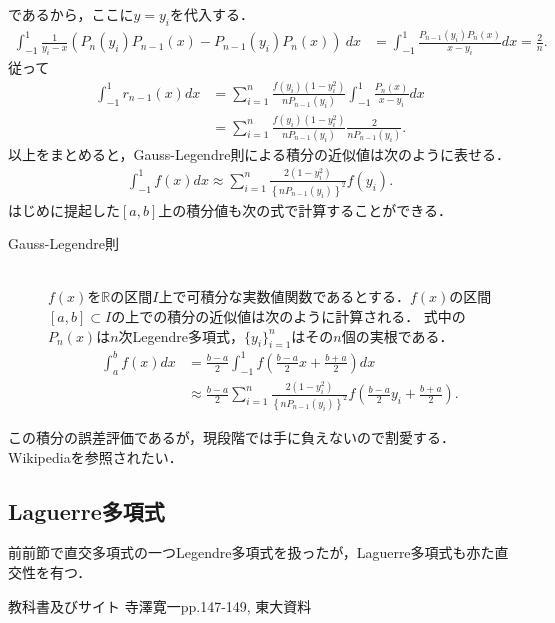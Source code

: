 \documentclass[a4j,papersize,disablejfam,slide,14pt]{jsarticle}
\begin{document}
    であるから，ここに$y = y_i$を代入する．
    \begin{align}
    	\int_{-1}^{1} \frac{1}{y_i - x} \left( P_n(y_i) P_{n-1}(x) - P_{n-1} (y_i) P_n(x) \right)\ dx
        &= \int_{-1}^{1} \frac{P_{n-1} (y_i) P_n(x)}{x - y_i} dx = \frac{2}{n}.
    \end{align}
    従って
    \begin{align}
    	\int_{-1}^{1} r_{n-1}(x) dx &= \sum_{i=1}^{n} \frac{f(y_i) (1-y_i^2)}{nP_{n-1}(y_i)} \int_{-1}^{1} \frac{P_n(x)}{x-y_i} dx \\
        &= \sum_{i=1}^{n} \frac{f(y_i) (1-y_i^2)}{nP_{n-1}(y_i)} \frac{2}{n P_{n-1} (y_i)}.
    \end{align}
    以上をまとめると，{\rm Gauss-Legendre}則による積分の近似値は次のように表せる．
    \begin{align}
    	\int_{-1}^{1} f(x) dx \approx \sum_{i=1}^{n} \frac{2(1-y_i^2)}{ \left\{nP_{n-1}(y_i) \right\}^2} f(y_i).
    \end{align}
    はじめに提起した$[a, b]$上の積分値も次の式で計算することができる．
    
    \begin{screen}
    \begin{description}
    	\item[{\rm Gauss-Legendre}則]\mbox{}\\
        $f(x)$を$\mathbb{R}$の区間$I$上で可積分な実数値関数であるとする．$f(x)$の区間$[a,b] \subset I$の上での積分の近似値は次のように計算される．
        式中の$P_n(x)$は$n$次{\rm Legendre}多項式，$\{y_i\}_{i=1}^{n}$はその$n$個の実根である．
    		\begin{align}
    			\int_{a}^{b} f(x) dx &= \frac{b-a}{2} \int_{-1}^{1} f\left( \frac{b-a}{2}x + \frac{b+a}{2} \right) dx \\
        		&\approx \frac{b-a}{2} \sum_{i=1}^{n} \frac{2(1-y_i^2)}{ \left\{nP_{n-1}(y_i) \right\}^2} f\left( \frac{b-a}{2}y_i + \frac{b+a}{2} \right).
    		\end{align}
    \end{description}
    \end{screen}
    この積分の誤差評価であるが，現段階では手に負えないので割愛する．{\rm Wikipedia}を参照されたい．

\subsection{{\rm Laguerre}多項式}
	前前節で直交多項式の一つ{\rm Legendre}多項式を扱ったが，{\rm Laguerre}多項式も亦た直交性を有つ．
    \begin{itembox}[l]{教科書及びサイト}
    	{\rm 寺澤寛一\cite{terakan}pp.147-149, 東大資料\cite{u_tokyo_legendre}}
    \end{itembox}
    
\end{document}
